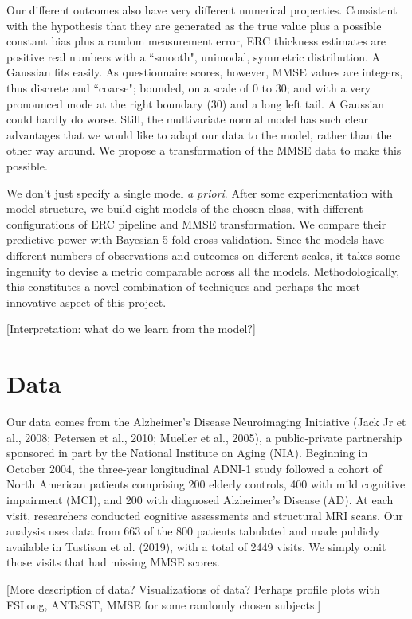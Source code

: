 \documentclass[12pt]{article}
\begin{document}
Our different outcomes also have very different numerical properties. Consistent with the hypothesis that they are generated as the true value plus a possible constant bias plus a random measurement error, ERC thickness estimates are positive real numbers with a ``smooth", unimodal, symmetric distribution. A Gaussian fits easily. As questionnaire scores, however, MMSE values are integers, thus discrete and ``coarse"; bounded, on a scale of 0 to 30; and with a very pronounced mode at the right boundary (30) and a long left tail. A Gaussian could hardly do worse. Still, the multivariate normal model has such clear advantages that we would like to adapt our data to the model, rather than the other way around. We propose a transformation of the MMSE data to make this possible. 

We don't just specify a single model \textit{a priori}. After some experimentation with model structure, we build eight models of the chosen class, with different configurations of ERC pipeline and MMSE transformation. We compare their predictive power with Bayesian 5-fold cross-validation. Since the models have different numbers of observations and outcomes on different scales, it takes some ingenuity to devise a metric comparable across all the models. Methodologically, this constitutes a novel combination of techniques and perhaps the most innovative aspect of this project. 

{\color{teal} [Interpretation: what do we learn from the model?]}

\pagebreak
\section{Data}

Our data comes from the Alzheimer's Disease Neuroimaging Initiative (Jack Jr et al., 2008; Petersen et al., 2010; Mueller et al., 2005), a public-private partnership sponsored in part by the National Institute on Aging (NIA). Beginning in October 2004, the three-year longitudinal ADNI-1 study followed a cohort of North American patients comprising 200 elderly controls, 400 with mild cognitive impairment (MCI), and 200 with diagnosed Alzheimer's Disease (AD). At each visit, researchers conducted cognitive assessments and structural MRI scans. Our analysis uses data from 663 of the 800 patients tabulated and made publicly available in Tustison et al. (2019), with a total of 2449 visits. We simply omit those visits that had missing MMSE scores.

{\color{teal} [More description of data? Visualizations of data? Perhaps profile plots with FSLong, ANTsSST, MMSE for some randomly chosen subjects.]}
\end{document}
